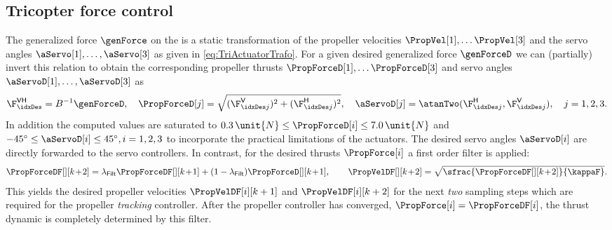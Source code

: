\subsection{Tricopter force control}
The generalized force $\genForce$ on the \Tricopter is a static transformation of the propeller velocities $\PropVel[1], \ldots \PropVel[3]$ and the servo angles $\aServo[1],\ldots,\aServo[3]$ as given in \eqref{eq:TriActuatorTrafo}.
For a given desired generalized force $\genForceD$ we can (partially) invert this relation to obtain the corresponding propeller thrusts $\PropForceD[1], \ldots \PropForceD[3]$ and servo angles $\aServoD[1],\ldots,\aServoD[3]$ as
\begin{align}\label{eq:TriInvActuatorTrafo}
 \F_{\idxDes}^\mathsf{VH} = B^{-1} \genForceD,
\quad
 \PropForceD[j] = \sqrt{(\F_{\idxDes j}^\mathsf{V})^2 + (\F_{\idxDes j}^\mathsf{H})^2},
\quad
 \aServoD[j] = \atanTwo(\F_{\idxDes j}^\mathsf{H}, \F_{\idxDes j}^\mathsf{V}),
\quad j = 1,2,3.
\end{align}
In addition the computed values are saturated to $0.3\,\unit{N} \leq \PropForceD[i] \leq 7.0\,\unit{N}$ and $-45^\circ\leq \aServoD[i] \leq 45^\circ, i=1,2,3$ to incorporate the practical limitations of the actuators.
The desired servo angles $\aServoD[i]$ are directly forwarded to the servo controllers.
In contrast, for the desired thrusts $\PropForce[i]$ a first order filter is applied:
\begin{align}\label{eq:PropPrefilter}
 \PropForceDF[][k\!+\!2] = \lambda_{\mathsf{Filt}} \PropForceDF[][k\!+\!1] + (1-\lambda_{\mathsf{Filt}}) \PropForceD[][k\!+\!1],
\qquad
 \PropVelDF[][k\!+\!2] = \sqrt{\sfrac{\PropForceDF[][k\!+\!2]}{\kappaF}}.
\end{align}
This yields the desired propeller velocities $\PropVelDF[i][k+1]$ and $\PropVelDF[i][k+2]$ for the next \textit{two} sampling steps which are required for the propeller \textit{tracking} controller.
After the propeller controller has converged, \ie $\PropForce[i] = \PropForceDF[i]$, the thrust dynamic is completely determined by this filter.


